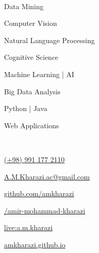 \documentclass[lighthipster]{simplehipstercv}
\begin{document}
\begin{paracol}{2}
{\bigskip

\\[0.5em]

\begin{spacing}{1.5}
Data Mining

Computer Vision

Natural Language Processing

Cognitive Science

Machine Learning | AI

Big Data Analysis

Python | Java

Web Applications
\end{spacing}

\bigskip

\vfill

\\[0.5em]
\justifying
\begin{spacing}{1.5}
	
	{\hspace{0.55mm}\large\faMobilePhone}\hspace{2mm}\href{tel:+989911772110}{(+98) 991 177 2110}
	
	{\faEnvelopeO}\hspace{2mm}\href{mailto: a.m.kharazi.ac@gmail.com}{A.M.Kharazi.ac@gmail.com}
	
	{\hspace{0.1mm}\faGithub}\hspace{2mm}\href{https://github.com/amkharazi}{github.com/amkharazi}
	
	{\hspace{0.55mm}\faLinkedin}\hspace{2mm}\href{www.linkedin.com/in/amir-mohammad-kharazi}{/amir-mohammad-kharazi}
	
	{\hspace{0.7mm}\faSkype}\hspace{2mm}\href{live:a.m.kharazi}{live:a.m.kharazi}
	
	{\hspace{0.7mm}\faGlobe}\hspace{2mm}\href{https://amkharazi.github.io/}{amkharazi.github.io}
	
\end{spacing}


}
\end{paracol}
\end{document}
